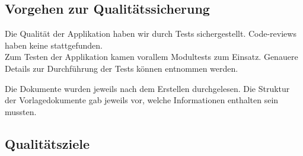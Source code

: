 \documentclass[10pt,paper=a4,final]{scrartcl}
\begin{document}
\subsection{Vorgehen zur Qualitätssicherung}
Die Qualit\"at der Applikation haben wir durch Tests sichergestellt. Code-reviews haben keine stattgefunden.\\
Zum Testen der Applikation kamen vorallem Modultests zum Einsatz. Genauere Details zur Durchf\"uhrung der Tests k\"onnen \cite[4. Systemtests]{realisierung} entnommen werden.

Die Dokumente wurden jeweils nach dem Erstellen durchgelesen. Die Struktur der Vorlagedokumente gab jeweils vor, welche Informationen enthalten sein mussten.
\subsection{Qualitätsziele}
\newpage
\end{document}
